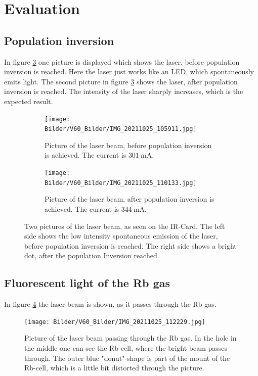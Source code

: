 \section{Evaluation}
\subsection{ Population inversion}
In figure \ref{fig:population} one picture is displayed which shows the laser, before population inversion is reached. Here the laser just works like an LED, which spontaneously emits light. 
The second picture in figure \ref{fig:population} shows the laser, after population inversion is reached. The intensity of the laser sharply increases, which is the expected result.
\begin{figure}
    \centering
    \begin{subfigure}{.5\textwidth}
      \centering
      \texttt{[image: Bilder/V60\_Bilder/IMG\_20211025\_105911.jpg]}
      \caption{Picture of the laser beam, before population inversion is achieved. The current is $\SI{301}{\milli\ampere}$.}
      \label{fig:su1}
    \end{subfigure}%
    \begin{subfigure}{.5\textwidth}
      \centering
      \texttt{[image: Bilder/V60\_Bilder/IMG\_20211025\_110133.jpg]}
      \caption{Picture of the laser beam, after population inversion is achieved. The current is $\SI{344}{\milli\ampere}$.}
      \label{fig:su2}
    \end{subfigure}
    \caption{Two pictures of the laser beam, as seen on the IR-Card. The left side shows the low intensity spontaneous emission of the laser, before population inversion is reached. The right side shows a bright dot, after the population Inversion reached.}
    \label{fig:population}
    \end{figure}

\subsection{ Fluorescent light of the Rb gas}
In figure \ref{fig:beam} the laser beam is shown, as it passes through the Rb gas. 
\begin{figure}
    \centering
    \texttt{[image: Bilder/V60\_Bilder/IMG\_20211025\_112229.jpg]}
    \caption{Picture of the laser beam passing through the Rb gas. In the hole in the middle one can see the Rb-cell, where the bright beam passes through. The outer blue "donut"-shape is part of the mount of the Rb-cell, which is a little bit distorted through the picture. }
    \label{fig:beam}
\end{figure}
